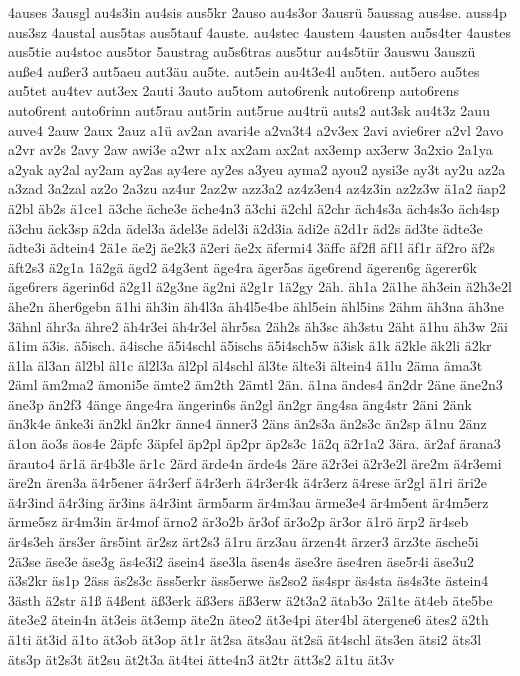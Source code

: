 {4auses
3ausgl
au4s3in
au4sis
aus5kr
2auso
au4s3or
3ausrü
5aussag
aus4se.
auss4p
aus3sz
4austal
aus5tas
aus5tauf
4auste.
au4stec
4austem
4austen
au5s4ter
4austes
aus5tie
au4stoc
aus5tor
5austrag
au5s6tras
aus5tur
au4s5tür
3auswu
3auszü
auße4
außer3
aut5aeu
aut3äu
au5te.
aut5ein
au4t3e4l
au5ten.
aut5ero
au5tes
au5tet
au4tev
aut3ex
2auti
3auto
au5tom
auto6renk
auto6renp
auto6rens
auto6rent
auto6rinn
aut5rau
aut5rin
aut5rue
au4trü
auts2
aut3sk
au4t3z
2auu
auve4
2auw
2aux
2auz
a1ü
av2an
avari4e
a2va3t4
a2v3ex
2avi
avie6rer
a2vl
2avo
a2vr
av2s
2avy
2aw
awi3e
a2wr
a1x
ax2am
ax2at
ax3emp
ax3erw
3a2xio
2a1ya
a2yak
ay2al
ay2am
ay2as
ay4ere
ay2es
a3yeu
ayma2
ayou2
aysi3e
ay3t
ay2u
az2a
a3zad
3a2zal
az2o
2a3zu
az4ur
2az2w
azz3a2
az4z3en4
az4z3in
az2z3w
ä1a2
äap2
ä2bl
äb2s
ä1ce1
ä3che
äche3e
äche4n3
ä3chi
ä2chl
ä2chr
äch4s3a
äch4s3o
äch4sp
ä3chu
äck3sp
ä2da
ädel3a
ädel3e
ädel3i
ä2d3ia
ädi2e
ä2d1r
äd2s
äd3te
ädte3e
ädte3i
ädtein4
2ä1e
äe2j
äe2k3
ä2eri
äe2x
äfermi4
3äffc
äf2fl
äf1l
äf1r
äf2ro
äf2s
äft2s3
ä2g1a
1ä2gä
ägd2
ä4g3ent
äge4ra
äger5as
äge6rend
ägeren6g
ägerer6k
äge6rers
ägerin6d
ä2g1l
ä2g3ne
äg2ni
ä2g1r
1ä2gy
2äh.
äh1a
2ä1he
äh3ein
ä2h3e2l
ähe2n
äher6gebn
ä1hi
äh3in
äh4l3a
äh4l5e4be
ähl5ein
ähl5ins
2ähm
äh3na
äh3ne
3ähnl
ähr3a
ähre2
äh4r3ei
äh4r3el
ähr5sa
2äh2s
äh3sc
äh3stu
2äht
ä1hu
äh3w
2äi
ä1im
ä3is.
ä5isch.
ä4ische
ä5i4schl
ä5ischs
ä5i4sch5w
ä3isk
ä1k
ä2kle
äk2li
ä2kr
ä1la
äl3an
äl2bl
äl1c
äl2l3a
äl2pl
äl4schl
äl3te
älte3i
ältein4
ä1lu
2äma
äma3t
2äml
äm2ma2
ämoni5e
ämte2
äm2th
2ämtl
2än.
ä1na
ändes4
än2dr
2äne
äne2n3
äne3p
än2f3
4änge
änge4ra
ängerin6s
än2gl
än2gr
äng4sa
äng4str
2äni
2änk
än3k4e
änke3i
än2kl
än2kr
änne4
änner3
2äns
än2s3a
än2s3c
än2sp
ä1nu
2änz
ä1on
äo3s
äos4e
2äpfc
3äpfel
äp2pl
äp2pr
äp2s3c
1ä2q
ä2r1a2
3ära.
är2af
ärana3
ärauto4
är1ä
är4b3le
är1c
2ärd
ärde4n
ärde4s
2äre
ä2r3ei
ä2r3e2l
äre2m
ä4r3emi
äre2n
ären3a
ä4r5ener
ä4r3erf
ä4r3erh
ä4r3er4k
ä4r3erz
ä4rese
är2gl
ä1ri
äri2e
ä4r3ind
ä4r3ing
är3ins
ä4r3int
ärm5arm
är4m3au
ärme3e4
är4m5ent
är4m5erz
ärme5sz
är4m3in
är4mof
ärno2
är3o2b
är3of
är3o2p
är3or
ä1rö
ärp2
är4seb
är4s3eh
ärs3er
ärs5int
är2sz
ärt2s3
ä1ru
ärz3au
ärzen4t
ärzer3
ärz3te
äsche5i
2ä3se
äse3e
äse3g
äs4e3i2
äsein4
äse3la
äsen4s
äse3re
äse4ren
äse5r4i
äse3u2
ä3s2kr
äs1p
2äss
äs2s3c
äss5erkr
äss5erwe
äs2so2
äs4spr
äs4sta
äs4s3te
ästein4
3ästh
ä2str
ä1ß
ä4ßent
äß3erk
äß3ers
äß3erw
ä2t3a2
ätab3o
2ä1te
ät4eb
äte5be
äte3e2
ätein4n
ät3eis
ät3emp
äte2n
äteo2
ät3e4pi
äter4bl
ätergene6
ätes2
ä2th
ä1ti
ät3id
ä1to
ät3ob
ät3op
ät1r
ät2sa
äts3au
ät2sä
ät4schl
äts3en
ätsi2
äts3l
äts3p
ät2s3t
ät2su
ät2t3a
ät4tei
ätte4n3
ät2tr
ätt3s2
ä1tu
ät3v
}
